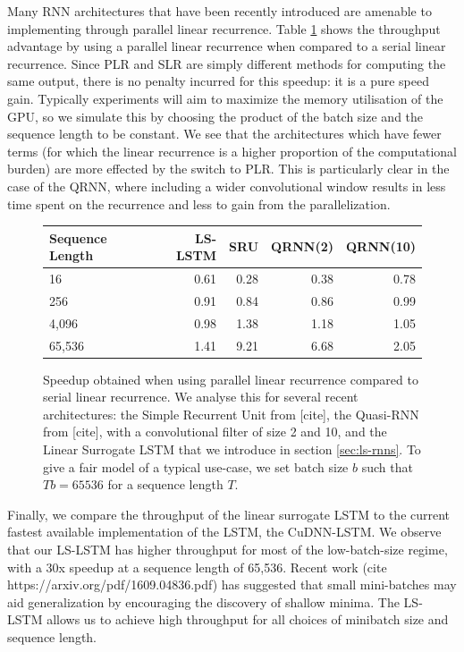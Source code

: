 \documentclass{article}
\begin{document}
Many RNN architectures that have been recently introduced are amenable to
implementing through parallel linear recurrence. Table
\ref{table:rnn-throughput} shows the throughput advantage by using a parallel
linear recurrence when compared to a serial linear recurrence. Since PLR and SLR
are simply different methods for computing the same output, there is no penalty
incurred for this speedup: it is a pure speed gain. Typically experiments will aim
to maximize the memory utilisation of the GPU, so we simulate this by choosing the
product of the batch size and the sequence length to be constant. We see that the
architectures which have fewer terms (for which the linear recurrence is a higher
proportion of the computational burden) are more effected by the switch to PLR.
This is particularly clear in the case of the QRNN, where including a wider
convolutional window results in less time spent on the recurrence and less to gain
from the parallelization. 
\begin{figure}
\begin{center}
  \begin{tabular}{lrrrr}
    \label{table:rnn-throughput}
Sequence Length & LS-LSTM & SRU & QRNN(2) & QRNN(10)\\
\hline
16 & 0.61 & 0.28 & 0.38 & 0.78\\
256 & 0.91 & 0.84 & 0.86 & 0.99\\
4,096 & 0.98 & 1.38 & 1.18 & 1.05\\
65,536 & 1.41 & 9.21 & 6.68 & 2.05\\
  \end{tabular}  
\end{center}
\caption{Speedup obtained when using parallel linear recurrence compared
    to serial linear recurrence. We analyse this for several recent architectures:
    the Simple Recurrent Unit from [cite], the Quasi-RNN from [cite], with a
    convolutional filter of size 2 and 10, and the Linear Surrogate LSTM that
    we introduce in section \ref{sec:ls-rnns}. To give a fair model of a
    typical use-case, we set batch size \(b\) such that \(Tb = 65536\)
    for a sequence length \(T\).}
\end{figure}

Finally, we compare the throughput of the linear surrogate LSTM to the current
fastest available implementation of the LSTM, the CuDNN-LSTM. We observe that our
LS-LSTM has higher throughput for most of the low-batch-size regime, with a 30x
speedup at a sequence length of 65,536. Recent work (cite https://arxiv.org/pdf/1609.04836.pdf)
has suggested that small mini-batches may aid generalization by encouraging
the discovery of shallow minima. The LS-LSTM allows us to achieve high throughput
for all choices of minibatch size and sequence length.
\end{document}
